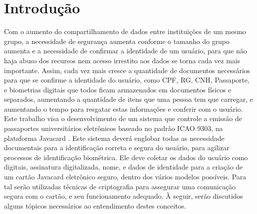 \documentclass{article}
\begin{document}
	\newpage

	\tableofcontents
	\newpage


	
	\section{Introdução}
		\begin{flushleft}
			\begin{large}
			\hspace{2cm}Com o aumento do compartilhamento de dados entre instituições de um mesmo grupo, a necessidade de segurança aumenta conforme o tamanho do grupo aumenta e a necessidade de confirmar a identidade de um usuário, para que não haja abuso dos recursos nem acesso irrestito aos dados se torna cada vez mais importante. Assim, cada vez mais cresce a quantidade de documentos necessários para que se confirme a identidade do usuário, como CPF, RG, CNH, Passaporte, e biometrias digitais que todos ficam armazenados em documentos físicos e separados, aumentando a quantidade de itens que uma pessoa tem que carregar, e aumentando o tempo para resgatar estas informações e conferir com o usuário. \\
			\hspace{2cm} Este trabalho visa o desenvolvimento de um sistema que controle a emissão de passaportes universitários eletrônicos baseado no padrão ICAO 9303, na plataforma Javacard \cite{JAVACHEN}. Este sistema deverá englobar todas as necessidade documentais para a identificação correta e segura do usuário, para agilizar processos de identificação biométrica. Ele deve coletar os dados do usuário como digitais, assinatura digitalizada, nome, e dados de identidade para a criação de um cartão Javacard eletrônico seguro, dentro dos vários modelos possíveis. Para tal serão utilizadas técnicas de criptografia para assegurar uma comunicação segura com o cartão, e seu funcionamento adequado. À seguir, serão discutidos alguns tópicos necessários ao entendimento destes conceitos.

			\end{large}
		\end{flushleft}
\end{document}
